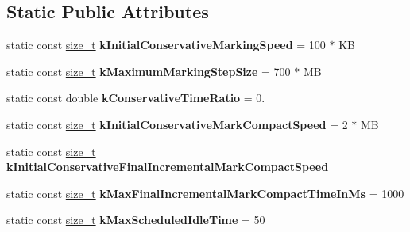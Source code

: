 \subsection*{Static Public Attributes}
\begin{DoxyCompactItemize}
\item 
\mbox{\label{classv8_1_1internal_1_1GCIdleTimeHandler_a4cea45c6a3a359582e1e787691ec46e1}} 
static const \mbox{\hyperlink{classsize__t}{size\+\_\+t}} {\bfseries k\+Initial\+Conservative\+Marking\+Speed} = 100 $\ast$ KB
\item 
\mbox{\label{classv8_1_1internal_1_1GCIdleTimeHandler_ab4cccaad31be98d3d064a19bac735aca}} 
static const \mbox{\hyperlink{classsize__t}{size\+\_\+t}} {\bfseries k\+Maximum\+Marking\+Step\+Size} = 700 $\ast$ MB
\item 
\mbox{\label{classv8_1_1internal_1_1GCIdleTimeHandler_a4242355d37d9b94c8c366d62d8f4a4da}} 
static const double {\bfseries k\+Conservative\+Time\+Ratio} = 0.
\item 
\mbox{\label{classv8_1_1internal_1_1GCIdleTimeHandler_a55817441b828a13cfa425466e23e3aaa}} 
static const \mbox{\hyperlink{classsize__t}{size\+\_\+t}} {\bfseries k\+Initial\+Conservative\+Mark\+Compact\+Speed} = 2 $\ast$ MB
\item 
static const \mbox{\hyperlink{classsize__t}{size\+\_\+t}} {\bfseries k\+Initial\+Conservative\+Final\+Incremental\+Mark\+Compact\+Speed}
\item 
\mbox{\label{classv8_1_1internal_1_1GCIdleTimeHandler_a652e7b5e49fe3251bc270db42a647a9d}} 
static const \mbox{\hyperlink{classsize__t}{size\+\_\+t}} {\bfseries k\+Max\+Final\+Incremental\+Mark\+Compact\+Time\+In\+Ms} = 1000
\item 
\mbox{\label{classv8_1_1internal_1_1GCIdleTimeHandler_a49215ab3e57f3d33ae146d371c2afebd}} 
static const \mbox{\hyperlink{classsize__t}{size\+\_\+t}} {\bfseries k\+Max\+Scheduled\+Idle\+Time} = 50
\item 
\mbox{\label{classv8_1_1internal_1_1GCIdleTimeHandler_a74962b6fe809a1066c3638ed4c79cd89}} 

\end{DoxyCompactItemize}
